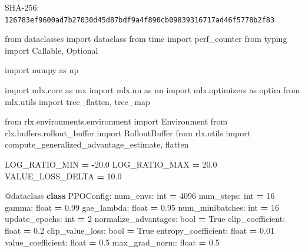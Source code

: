 \documentclass[
  chinese,
  11pt,
  letterpaper,
]{article}
\newenvironment{Shaded}{\begin{snugshade}}{\end{snugshade}}
\newcommand{\AttributeTok}[1]{\textcolor[rgb]{0.13,0.29,0.53}{#1}}
\newcommand{\BuiltInTok}[1]{#1}
\newcommand{\DecValTok}[1]{\textcolor[rgb]{0.00,0.00,0.81}{#1}}
\newcommand{\FloatTok}[1]{\textcolor[rgb]{0.00,0.00,0.81}{#1}}
\newcommand{\ImportTok}[1]{#1}
\newcommand{\KeywordTok}[1]{\textcolor[rgb]{0.13,0.29,0.53}{\textbf{#1}}}
\newcommand{\NormalTok}[1]{#1}
\newcommand{\OperatorTok}[1]{\textcolor[rgb]{0.81,0.36,0.00}{\textbf{#1}}}
\newcommand{\VariableTok}[1]{\textcolor[rgb]{0.00,0.00,0.00}{#1}}
\renewenvironment{Shaded}{\par\smallskip}{\par\smallskip}
\begin{document}
SHA-256:
\texttt{126783ef\allowbreak{}9600ad7b\allowbreak{}27030d45\allowbreak{}d87bdf9a\allowbreak{}4f890cb0\allowbreak{}98393167\allowbreak{}17ad46f5\allowbreak{}778b2f83\allowbreak{}}

\begin{Shaded}
\begin{Highlighting}[]
\ImportTok{from}\NormalTok{ dataclasses }\ImportTok{import}\NormalTok{ dataclass}
\ImportTok{from}\NormalTok{ time }\ImportTok{import}\NormalTok{ perf\_counter}
\ImportTok{from}\NormalTok{ typing }\ImportTok{import}\NormalTok{ Callable, Optional}

\ImportTok{import}\NormalTok{ numpy }\ImportTok{as}\NormalTok{ np}

\ImportTok{import}\NormalTok{ mlx.core }\ImportTok{as}\NormalTok{ mx}
\ImportTok{import}\NormalTok{ mlx.nn }\ImportTok{as}\NormalTok{ nn}
\ImportTok{import}\NormalTok{ mlx.optimizers }\ImportTok{as}\NormalTok{ optim}
\ImportTok{from}\NormalTok{ mlx.utils }\ImportTok{import}\NormalTok{ tree\_flatten, tree\_map}

\ImportTok{from}\NormalTok{ rlx.environments.environment }\ImportTok{import}\NormalTok{ Environment}
\ImportTok{from}\NormalTok{ rlx.buffers.rollout\_buffer }\ImportTok{import}\NormalTok{ RolloutBuffer}
\ImportTok{from}\NormalTok{ rlx.utils }\ImportTok{import}\NormalTok{ compute\_generalized\_advantage\_estimate, flatten}


\NormalTok{LOG\_RATIO\_MIN }\OperatorTok{=} \OperatorTok{{-}}\FloatTok{20.0}
\NormalTok{LOG\_RATIO\_MAX }\OperatorTok{=} \FloatTok{20.0}
\NormalTok{VALUE\_LOSS\_DELTA }\OperatorTok{=} \FloatTok{10.0}


\AttributeTok{@dataclass}
\KeywordTok{class}\NormalTok{ PPOConfig:}
\NormalTok{    num\_envs: }\BuiltInTok{int} \OperatorTok{=} \DecValTok{4096}
\NormalTok{    num\_steps: }\BuiltInTok{int} \OperatorTok{=} \DecValTok{16}
\NormalTok{    gamma: }\BuiltInTok{float} \OperatorTok{=} \FloatTok{0.99}
\NormalTok{    gae\_lambda: }\BuiltInTok{float} \OperatorTok{=} \FloatTok{0.95}
\NormalTok{    num\_minibatches: }\BuiltInTok{int} \OperatorTok{=} \DecValTok{16}
\NormalTok{    update\_epochs: }\BuiltInTok{int} \OperatorTok{=} \DecValTok{2}
\NormalTok{    normalize\_advantages: }\BuiltInTok{bool} \OperatorTok{=} \VariableTok{True}
\NormalTok{    clip\_coefficient: }\BuiltInTok{float} \OperatorTok{=} \FloatTok{0.2}
\NormalTok{    clip\_value\_loss: }\BuiltInTok{bool} \OperatorTok{=} \VariableTok{True}
\NormalTok{    entropy\_coefficient: }\BuiltInTok{float} \OperatorTok{=} \FloatTok{0.01}
\NormalTok{    value\_coefficient: }\BuiltInTok{float} \OperatorTok{=} \FloatTok{0.5}
\NormalTok{    max\_grad\_norm: }\BuiltInTok{float} \OperatorTok{=} \FloatTok{0.5}



\end{Highlighting}
\end{Shaded}
\end{document}
